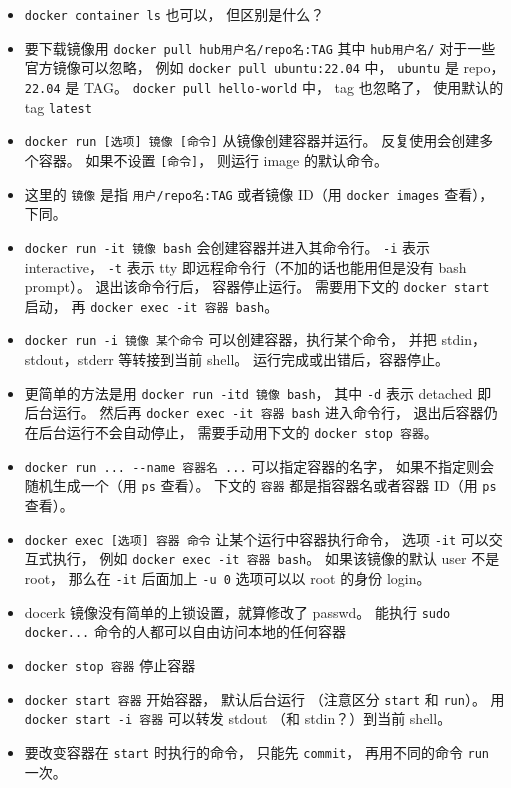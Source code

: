 \begin{itemize}
\item \verb`docker container ls` 也可以， 但区别是什么？
\item 要下载镜像用 \verb`docker pull hub用户名/repo名:TAG` 其中 \verb`hub用户名/` 对于一些官方镜像可以忽略， 例如 \verb`docker pull ubuntu:22.04` 中， \verb`ubuntu` 是 repo， \verb`22.04` 是 TAG。 \verb`docker pull hello-world` 中， tag 也忽略了， 使用默认的 tag \verb`latest`
\item \verb`docker run [选项] 镜像 [命令]` 从镜像创建容器并运行。 反复使用会创建多个容器。 如果不设置 \verb`[命令]`， 则运行 image 的默认命令。
\item 这里的 \verb`镜像` 是指 \verb`用户/repo名:TAG` 或者镜像 ID（用 \verb`docker images` 查看）， 下同。
\item \verb`docker run -it 镜像 bash` 会创建容器并进入其命令行。 \verb`-i` 表示 interactive， \verb`-t` 表示 tty 即远程命令行（不加的话也能用但是没有 bash prompt）。 退出该命令行后， 容器停止运行。 需要用下文的 \verb`docker start` 启动， 再 \verb`docker exec -it 容器 bash`。
\item \verb`docker run -i 镜像 某个命令` 可以创建容器，执行某个命令， 并把 stdin，stdout，stderr 等转接到当前 shell。 运行完成或出错后，容器停止。
\item 更简单的方法是用 \verb`docker run -itd 镜像 bash`， 其中 \verb`-d` 表示 detached 即后台运行。 然后再 \verb`docker exec -it 容器 bash` 进入命令行， 退出后容器仍在后台运行不会自动停止， 需要手动用下文的 \verb`docker stop 容器`。
\item \verb`docker run ... --name 容器名 ...` 可以指定容器的名字， 如果不指定则会随机生成一个（用 \verb`ps` 查看）。 下文的 \verb`容器` 都是指容器名或者容器 ID（用 \verb`ps` 查看）。
\item \verb`docker exec [选项] 容器 命令` 让某个运行中容器执行命令， 选项 \verb`-it` 可以交互式执行， 例如 \verb`docker exec -it 容器 bash`。 如果该镜像的默认 user 不是 root， 那么在 \verb`-it` 后面加上 \verb`-u 0` 选项可以以 root 的身份 login。
\item docerk 镜像没有简单的上锁设置，就算修改了 passwd。 能执行 \verb`sudo docker...` 命令的人都可以自由访问本地的任何容器
\item \verb`docker stop 容器` 停止容器
\item \verb`docker start 容器` 开始容器， 默认后台运行 （注意区分 \verb`start` 和 \verb`run`）。 用 \verb`docker start -i 容器` 可以转发 stdout （和 stdin？）到当前 shell。
\item 要改变容器在 \verb`start` 时执行的命令， 只能先 \verb`commit`， 再用不同的命令 \verb`run` 一次。

\end{itemize}
